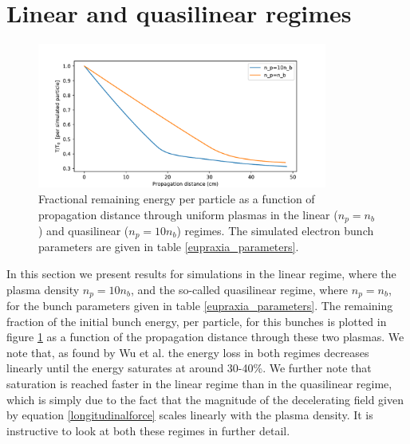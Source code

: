 \section{Linear and quasilinear regimes}
\begin{figure}
\centering
\includegraphics[width=0.85\textwidth]{Energy30pc_per_particle_lowres2.pdf}
\caption{\small{Fractional remaining energy per particle as a function of propagation distance through uniform plasmas in the linear ($n_p=n_b$) and quasilinear ($n_p=10n_b$) regimes. The simulated electron bunch parameters are given in table \ref{eupraxia_parameters}.}}
\label{energyloss}
\end{figure}
In this section we present results for simulations in the linear regime, where the plasma density $n_p=10n_b$, and the so-called quasilinear regime, where $n_p=n_b$, for the bunch parameters given  in table \ref{eupraxia_parameters}. The remaining fraction of the initial bunch energy, per particle, for this bunches is plotted in figure \ref{energyloss} as a function of the propagation distance through these two plasmas. We note that, as found by Wu et al. \cite{Wu2010} the energy loss in both regimes decreases linearly until the energy saturates at around 30-40\%. We further note that saturation is reached faster in the linear regime than in the quasilinear regime, which is simply due to the fact that the magnitude of the decelerating field given by equation \ref{longitudinalforce} scales linearly with the plasma density. It is instructive to look at both these regimes in further detail.\\
